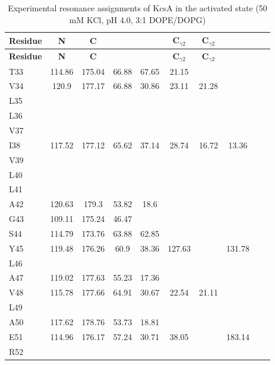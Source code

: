 \documentclass[%
 aip,
 amsmath,amssymb,
 preprint,%
]{revtex4-1}
\newcommand{\ca}{\ce{C_\alpha} }
\newcommand{\cb}{\ce{C_\beta} }
\newcommand{\cd}{\ce{C_\delta} }
\newcommand{\cep}{\ce{C_\epsilon} }
\newcommand{\cz}{\ce{C_\zeta} }
\begin{document}
\begingroup
\begin{center}
\begin{longtable}{l|c|c|c|c|c|c|c|c|c}
\caption{\scriptsize Experimental resonance assignments of KcsA in the activated state (50 mM KCl, pH 4.0, 3:1 DOPE/DOPG)\label{SI_tb_activated_exp_CS}}\\ \hline \hline 
\textbf{Residue} & \textbf{N} & \textbf{C} & \textbf{\ca} & \textbf{\cb} & \textbf{C$_{\gamma2}$} & \textbf{C$_{\gamma2}$} & \textbf{\cd} & \textbf{\cep} & \textbf{\cz} \\ \hline
\endfirsthead 
\hline
\textbf{Residue} & \textbf{N} & \textbf{C} & \textbf{\ca} & \textbf{\cb} & \textbf{C$_{\gamma2}$} & \textbf{C$_{\gamma2}$} & \textbf{\cd} & \textbf{\cep} & \textbf{\cz} \\ \hline
\endhead
T33 & 114.86 & 175.04 & 66.88 & 67.65 & 21.15 & & & & \\ \hline
V34 & 120.9 & 177.17 & 66.88 & 30.86 & 23.11 & 21.28 & & & \\ \hline
L35 & & & & & & & & & \\ \hline
L36 & & & & & & & & & \\ \hline
V37 & & & & & & & & & \\ \hline
I38 & 117.52 & 177.12 & 65.62 & 37.14 & 28.74 & 16.72 & 13.36 & & \\ \hline
V39 & & & & & & & & & \\ \hline
L40 & & & & & & & & & \\ \hline
L41 & & & & & & & & & \\ \hline
A42 & 120.63 & 179.3 & 53.82 & 18.6 & & & & & \\ \hline
G43 & 109.11 & 175.24 & 46.47 & & & & & & \\ \hline
S44 & 114.79 & 173.76 & 63.88 & 62.85 & & & & & \\ \hline
Y45 & 119.48 & 176.26 & 60.9 & 38.36 & 127.63 & & 131.78 & & \\ \hline
L46 & & & & & & & & & \\ \hline
A47 & 119.02 & 177.63 & 55.23 & 17.36 & & & & & \\ \hline
V48 & 115.78 & 177.66 & 64.91 & 30.67 & 22.54 & 21.11 & & & \\ \hline
L49 & & & & & & & & & \\ \hline
A50 & 117.62 & 178.76 & 53.73 & 18.81 & & & & & \\ \hline
E51 & 114.96 & 176.17 & 57.24 & 30.71 & 38.05 & & 183.14 & & \\ \hline
R52 & & & & & & & & & \\ \hline

\end{longtable}
\end{center}
\end{document}
